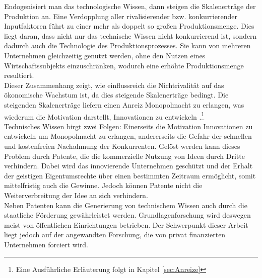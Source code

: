 %
Endogenisiert man das technologische Wissen, dann steigen die Skalenerträge der Produktion an. Eine Verdopplung aller rivalisierender bzw. konkurrierender Inputfaktoren führt zu einer mehr als doppelt so großen Produktionsmenge. Dies liegt daran, dass nicht nur das technische Wissen nicht konkurrierend ist, sondern dadurch auch die Technologie des Produktionsprozesses. Sie kann von mehreren Unternehmen gleichzeitig genutzt werden, ohne den Nutzen eines Wirtschaftssubjekts einzuschränken, wodurch eine erhöhte Produktionsmenge resultiert.\\
%
Dieser Zusammenhang zeigt, wie einflussreich die Nichtrivalität auf das ökonomische Wachstum ist, da dies steigende Skalenerträge bedingt. Die steigenden Skalenerträge liefern einen Anreiz Monopolmacht zu erlangen, was wiederum die Motivation darstellt, Innovationen zu entwickeln \cite[S.556]{Jones.2005,Romer.1993}.\footnote{Eine Ausführliche Erläuterung folgt in Kapitel \ref{sec:Anreize}}\\
%
Technisches Wissen birgt zwei Folgen: Einerseits die Motivation Innovationen zu entwickeln um Monopolmacht zu erlangen, andererseits die Gefahr der schnellen und kostenfreien Nachahmung der Konkurrenten. 
Gelöst werden kann dieses Problem durch Patente, die die kommerzielle Nutzung von Ideen durch Dritte verhindern. Dabei wird das innovierende Unternehmen geschützt und der Erhalt der geistigen Eigentumsrechte über einen bestimmten Zeitraum ermöglicht, somit mittelfristig auch die Gewinne. Jedoch können Patente nicht die Weiterverbreitung der Idee an sich verhindern.\\
%
Neben Patenten kann die Generierung von technischem Wissen auch durch die staatliche Förderung gewährleistet werden. Grundlagenforschung wird deswegen meist von öffentlichen Einrichtungen betrieben. Der Schwerpunkt dieser Arbeit liegt jedoch auf der angewandten Forschung, die von privat finanzierten Unternehmen forciert wird.
%
